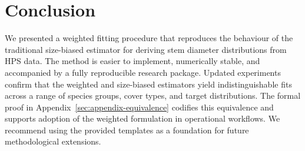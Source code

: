 \section{Conclusion}

We presented a weighted fitting procedure that reproduces the behaviour of the
traditional size-biased estimator for deriving stem diameter distributions from
HPS data. The method is easier to implement, numerically stable, and accompanied
by a fully reproducible research package. Updated experiments confirm that the
weighted and size-biased estimators yield indistinguishable fits across a range
of species groups, cover types, and target distributions. The formal proof in
Appendix~\ref{sec:appendix-equivalence} codifies this equivalence and supports
adoption of the weighted formulation in operational workflows. We recommend
using the provided templates as a foundation for future methodological
extensions.
